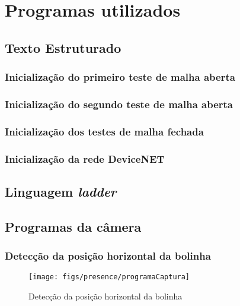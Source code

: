 


\chapter{Programas utilizados}

\section{Texto Estruturado}
\label {stsection}

\subsection{Inicialização do primeiro teste de malha aberta}
\label {stMAinit1}


\subsection{Inicialização do segundo teste de malha aberta}
\label {stMAinit2}


\subsection{Inicialização dos testes de malha fechada}
\label {stMFinit}


\subsection{Inicialização da rede DeviceNET}
\label{dninitST}


\section{Linguagem \textit{ladder}}

\section{Programas da câmera}
\subsection{Detecção da posição horizontal da bolinha}
\label{ballhorzpos}
\begin{figure}[!ht]
\centering
\texttt{[image: figs/presence/programaCaptura]}
\caption{Detecção da posição horizontal da bolinha}
\end{figure}